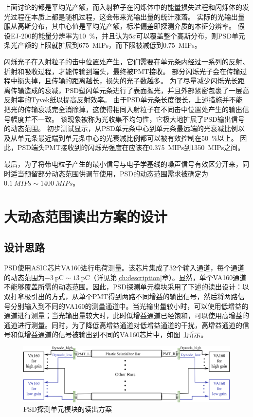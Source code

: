 上面讨论的都是平均光产额，而入射粒子在闪烁体中的能量损失过程和闪烁体的发光过程在本质上都是随机过程，这会带来光输出量的统计涨落。
实际的光输出量服从高斯分布，其中心值是平均光产额，标准偏差即探测介质的本征分辨率。
假设EJ-200的能量分辨率为\SI{10}{\percent}，并且认为$5\sigma$可以覆盖整个高斯分布，则PSD单元条光产额的上限就扩展到\SI{675}{MIPs}，而下限被减低到\SI{0.75}{MIPs}。

闪烁光子在入射粒子的击中位置处产生，它们需要在单元条内经过一系列的反射、折射和吸收过程，才能传输到端头，最终被PMT接收。
部分闪烁光子会在传输过程中损失掉，且传输的距离越长，损失的光子数越多。
为了尽量减少闪烁光长距离传输造成的衰减，PSD塑闪单元条进行了表面抛光，并且外部紧密包裹了一层高反射率的Tyvek纸以提高反射效率。
由于PSD单元条长度很长，上述措施并不能把光的传输衰减完全消除掉，这使得相同入射粒子在不同击中位置处产生的输出信号幅度并不一致。
该现象被称为光收集不均匀性，它极大地扩展了PSD输出信号的动态范围。
初步测试显示，从PSD单元条中心到单元条最远端的光衰减比例以及从单元条最近端到单元条中心的光衰减比例都可以被有效控制在\SI{50}{\percent}以上。
因此，PSD端头PMT接收到的闪烁光强度在应该在\SI{0.375}{MIPs}到\SI{1350}{MIPs}之间。

最后，为了将带电粒子产生的最小信号与电子学基线的噪声信号有效区分开来，同时适当预留部分动态范围供调节使用，PSD的动态范围需求被确定为$\SI{0.1}{MIPs}\sim\SI{1400}{MIPs}$。

\section{大动态范围读出方案的设计}
\label{sec:dynamic_range:design}

\subsection{设计思路}
\label{sec:dynamic_range:readout_scheme}
PSD使用ASIC芯片VA160进行电荷测量。该芯片集成了32个输入通道，每个通道的动态范围为$\SI{-3}{\pico\coulomb}\sim\SI{13}{\pico\coulomb}$（详见第\ref{ch:description}章）。显然，单个VA160通道不能够覆盖所需的动态范围。因此，PSD探测单元模块采用了下述的读出设计：以双打拿极引出的方式，从单个PMT得到两路不同增益的输出信号，然后将两路信号分别输入到不同的VA160的测量通道中。当光输出量较小时，可以使用低增益的通道进行测量；当光输出量较大时，此时低增益通道已经饱和，可以使用高增益的通道进行测量。同时，为了降低高增益通道对低增益通道的干扰，高增益通道的信号和低增益通道的信号被输出到不同的VA160芯片中，如图~\ref{fig:dynamic_range:readout_scheme}所示。

\begin{figure}[!htb]
	\centering
	\includegraphics[width=\textwidth]{chap/dynamic_range/fig/readout_scheme.eps}
	\caption{PSD探测单元模块的读出方案}
	\label{fig:dynamic_range:readout_scheme}
\end{figure}

